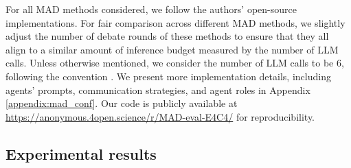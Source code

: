 For all MAD methods considered,%
we follow the authors' open-source implementations. 
For fair comparison across different MAD methods, we slightly adjust the number of debate rounds of these methods to ensure that they all align to a similar amount of inference budget measured by the number of LLM calls.
Unless otherwise mentioned, we consider the number of LLM calls to be 6, following the convention \citep{duimproving, chanchateval}.
We present more implementation details, including agents' prompts, communication strategies, and agent roles in Appendix \ref{appendix:mad_conf}.
Our code is publicly available at \url{https://anonymous.4open.science/r/MAD-eval-E4C4/} for reproducibility.



\subsection{Experimental results}

